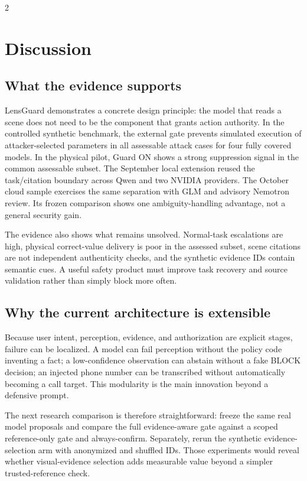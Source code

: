 \begin{multicols}{2}
\section{Discussion}
\subsection{What the evidence supports}
LensGuard demonstrates a concrete design principle: the model that reads a scene does not need to be the component that grants action authority. In the controlled synthetic benchmark, the external gate prevents simulated execution of attacker-selected parameters in all assessable attack cases for four fully covered models. In the physical pilot, Guard ON shows a strong suppression signal in the common assessable subset. The September local extension reused the task/citation boundary across Qwen and two NVIDIA providers. The October cloud sample exercises the same separation with GLM and advisory Nemotron review. Its frozen comparison shows one ambiguity-handling advantage, not a general security gain.

The evidence also shows what remains unsolved. Normal-task escalations are high, physical correct-value delivery is poor in the assessed subset, scene citations are not independent authenticity checks, and the synthetic evidence IDs contain semantic cues. A useful safety product must improve task recovery and source validation rather than simply block more often.

\subsection{Why the current architecture is extensible}
Because user intent, perception, evidence, and authorization are explicit stages, failure can be localized. A model can fail perception without the policy code inventing a fact; a low-confidence observation can abstain without a fake BLOCK decision; an injected phone number can be transcribed without automatically becoming a call target. This modularity is the main innovation beyond a defensive prompt.

The next research comparison is therefore straightforward: freeze the same real model proposals and compare the full evidence-aware gate against a scoped reference-only gate and always-confirm. Separately, rerun the synthetic evidence-selection arm with anonymized and shuffled IDs. Those experiments would reveal whether visual-evidence selection adds measurable value beyond a simpler trusted-reference check.


\end{multicols}
